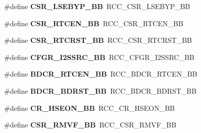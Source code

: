 \begin{DoxyCompactItemize}
\#define {\bfseries C\+S\+R\+\_\+\+L\+S\+E\+B\+Y\+P\+\_\+\+BB}~R\+C\+C\+\_\+\+C\+S\+R\+\_\+\+L\+S\+E\+B\+Y\+P\+\_\+\+BB
\item 
\mbox{\label{group___h_a_l___r_c_c___aliased_gac3641969630c9b8eb0f5da2f164a5892}} 
\#define {\bfseries C\+S\+R\+\_\+\+R\+T\+C\+E\+N\+\_\+\+BB}~R\+C\+C\+\_\+\+C\+S\+R\+\_\+\+R\+T\+C\+E\+N\+\_\+\+BB
\item 
\mbox{\label{group___h_a_l___r_c_c___aliased_ga55aab5ed906bf71760d81cc5acefd55c}} 
\#define {\bfseries C\+S\+R\+\_\+\+R\+T\+C\+R\+S\+T\+\_\+\+BB}~R\+C\+C\+\_\+\+C\+S\+R\+\_\+\+R\+T\+C\+R\+S\+T\+\_\+\+BB
\item 
\mbox{\label{group___h_a_l___r_c_c___aliased_ga9076f5ddbb262fd45584702f5d280c9e}} 
\#define {\bfseries C\+F\+G\+R\+\_\+\+I2\+S\+S\+R\+C\+\_\+\+BB}~R\+C\+C\+\_\+\+C\+F\+G\+R\+\_\+\+I2\+S\+S\+R\+C\+\_\+\+BB
\item 
\mbox{\label{group___h_a_l___r_c_c___aliased_gaf70aaf70b0752ccb3a60307b2fb46038}} 
\#define {\bfseries B\+D\+C\+R\+\_\+\+R\+T\+C\+E\+N\+\_\+\+BB}~R\+C\+C\+\_\+\+B\+D\+C\+R\+\_\+\+R\+T\+C\+E\+N\+\_\+\+BB
\item 
\mbox{\label{group___h_a_l___r_c_c___aliased_ga892fdf297b85b85cbaf0723649b31818}} 
\#define {\bfseries B\+D\+C\+R\+\_\+\+B\+D\+R\+S\+T\+\_\+\+BB}~R\+C\+C\+\_\+\+B\+D\+C\+R\+\_\+\+B\+D\+R\+S\+T\+\_\+\+BB
\item 
\mbox{\label{group___h_a_l___r_c_c___aliased_ga08230c355dd58b92f14444c65521e248}} 
\#define {\bfseries C\+R\+\_\+\+H\+S\+E\+O\+N\+\_\+\+BB}~R\+C\+C\+\_\+\+C\+R\+\_\+\+H\+S\+E\+O\+N\+\_\+\+BB
\item 
\mbox{\label{group___h_a_l___r_c_c___aliased_ga69d10c519fec30b0177c26dbf7d44e02}} 
\#define {\bfseries C\+S\+R\+\_\+\+R\+M\+V\+F\+\_\+\+BB}~R\+C\+C\+\_\+\+C\+S\+R\+\_\+\+R\+M\+V\+F\+\_\+\+BB
\item 
\mbox{\label{group___h_a_l___r_c_c___aliased_gab84e7d3874237ee56e5cb3a26644cd13}} 

\end{DoxyCompactItemize}
